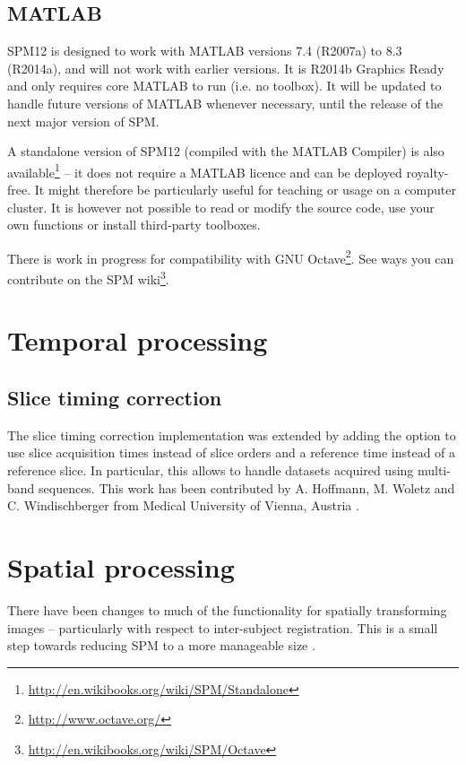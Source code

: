 \documentclass[a4paper,titlepage,openany]{article}
\begin{document}
\subsection{MATLAB}
SPM12 is designed to work with MATLAB versions 7.4 (R2007a) to 8.3 (R2014a), and will not work with earlier versions. It is R2014b Graphics Ready and only requires core MATLAB to run (i.e. no toolbox). It will be updated to handle future versions of MATLAB whenever necessary, until the release of the next major version of SPM.

A standalone version of SPM12 (compiled with the MATLAB Compiler) is also available\footnote{\url{http://en.wikibooks.org/wiki/SPM/Standalone}} -- it does not require a MATLAB licence and can be deployed royalty-free. It might therefore be particularly useful for teaching or usage on a computer cluster. It is however not possible to read or modify the source code, use your own functions or install third-party toolboxes.

There is work in progress for compatibility with GNU Octave\footnote{\url{http://www.octave.org/}}. See ways you can contribute on the SPM wiki\footnote{\url{http://en.wikibooks.org/wiki/SPM/Octave}}.

\section{Temporal processing}

\subsection{Slice timing correction}
The slice timing correction implementation was extended by adding the option to use slice acquisition times instead of slice orders and a reference time instead of a reference slice. In particular, this allows to handle datasets acquired using multi-band sequences. This work has been contributed by A. Hoffmann, M. Woletz and C. Windischberger from Medical University of Vienna, Austria \cite{woletz2014st}.

\section{Spatial processing}
There have been changes to much of the functionality for spatially transforming images -- particularly with respect to inter-subject registration.
This is a small step towards reducing SPM to a more manageable size \cite{ashburner2011spm}.
\end{document}
